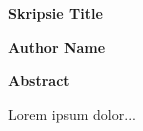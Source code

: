 
\thispagestyle{plain}
\begin{center}
    \Large
    \textbf{Skripsie Title}
    
    \vspace{0.4cm}
    \large
    
    \vspace{0.4cm}
    \textbf{Author Name}
    
    \vspace{0.9cm}
    \textbf{Abstract}
\end{center}
Lorem ipsum dolor...